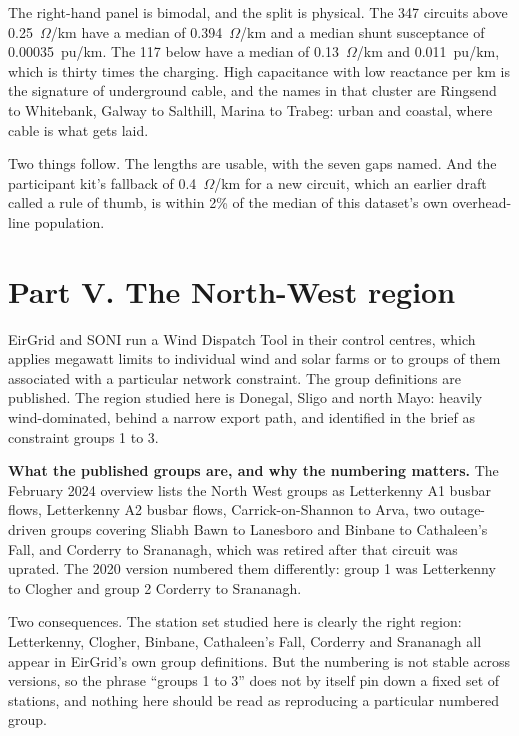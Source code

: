 \documentclass[11pt,a4paper]{article}
\begin{document}
The right-hand panel is bimodal, and the split is physical. The 347 circuits
above 0.25~$\Omega$/km have a median of 0.394~$\Omega$/km and a median shunt
susceptance of 0.00035~pu/km. The 117 below have a median of 0.13~$\Omega$/km
and 0.011~pu/km, which is thirty times the charging. High capacitance with low
reactance per km is the signature of underground cable, and the names in that
cluster are Ringsend to Whitebank, Galway to Salthill, Marina to Trabeg: urban
and coastal, where cable is what gets laid.

Two things follow. The lengths are usable, with the seven gaps named. And the
participant kit's fallback of 0.4~$\Omega$/km for a new circuit, which an
earlier draft called a rule of thumb, is within 2\% of the median of this
dataset's own overhead-line population.

\clearpage
\section{Part V. The North-West region}
\label{sec:northwest}

EirGrid and SONI run a Wind Dispatch Tool in their control centres, which
applies megawatt limits to individual wind and solar farms or to groups of them
associated with a particular network constraint. The group definitions are
published. The region studied here is Donegal, Sligo
and north Mayo: heavily wind-dominated, behind a narrow export path, and
identified in the brief as constraint groups 1 to 3.

\textbf{What the published groups are, and why the numbering matters.} The
February 2024 overview lists the North West groups as Letterkenny A1 busbar
flows, Letterkenny A2 busbar flows, Carrick-on-Shannon to Arva, two
outage-driven groups covering Sliabh Bawn to Lanesboro and Binbane to
Cathaleen's Fall, and Corderry to Srananagh, which was retired after that
circuit was uprated. The 2020 version numbered them differently: group 1 was
Letterkenny to Clogher and group 2 Corderry to Srananagh.

Two consequences. The station set studied here is clearly the right region:
Letterkenny, Clogher, Binbane, Cathaleen's Fall, Corderry and Srananagh all
appear in EirGrid's own group definitions. But the numbering is not stable
across versions, so the phrase ``groups 1 to 3'' does not by itself pin down a
fixed set of stations, and nothing here should be read as reproducing a
particular numbered group.
\end{document}
